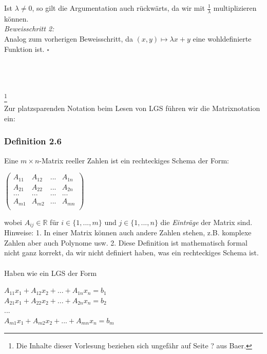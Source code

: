 \documentclass{article}
\begin{document}
Ist $\lambda \neq 0$, so gilt die Argumentation auch rückwärts, da wir mit $\frac{1}{\lambda}$ multiplizieren können. \\
\textit{Beweisschritt 2:} \\
Analog zum vorherigen Beweisschritt, da $(x,y) \mapsto \lambda x + y$ eine wohldefinierte Funktion ist. $\square$ \\
\\
\\
\\
\date{Mittwoch, 08.11.23} \footnote[1]{Die Inhalte dieser Vorlesung beziehen sich ungefähr auf Seite ? aus Baer.} \\
Zur platzsparenden Notation beim Lesen von LGS führen wir die Matrixnotation ein: \\

\subsubsection*{Definition 2.6}
Eine $m \times n$-Matrix reeller Zahlen ist ein rechteckiges Schema der Form: \\
\begin{center}
    $\begin{pmatrix}
        A_{11} & A_{12} & ... & A_{1n} \\
        A_{21} & A_{22} & ... & A_{2n} \\
        ... & ... & ... & ... \\
        A_{m1} & A_{m2} & ... & A_{mn} \\
    \end{pmatrix}$
\end{center}
wobei $A_{ij} \in \mathbb{R}$ für $i \in \{1, ..., m\}$ und $j \in \{1, ..., n\}$ die \textit{Einträge} der Matrix sind. \\
Hinweise: 1. In einer Matrix können auch andere Zahlen stehen, z.B. komplexe Zahlen aber auch Polynome usw. 2. Diese Definition ist mathematisch formal nicht ganz korrekt, da wir nicht definiert haben, was ein rechteckiges Schema ist. \\
\\
Haben wie ein LGS der Form \\
\begin{center}
    $A_{11}x_1 + A_{12}x_2 + ... + A_{1n}x_n = b_1$ \\
    $A_{21}x_1 + A_{22}x_2 + ... + A_{2n}x_n = b_2$ \\
    ... \\
    $A_{m1}x_1 + A_{m2}x_2 + ... + A_{mn}x_n = b_m$ \\
\end{center}
\end{document}
